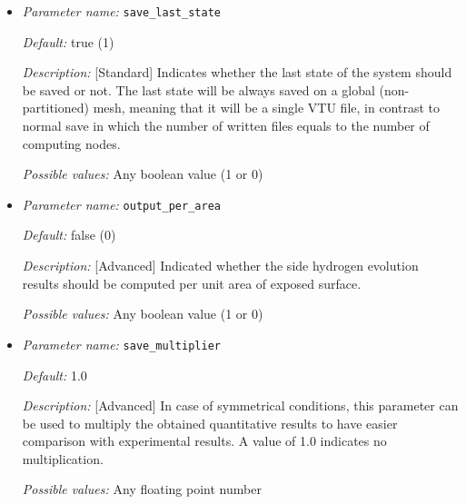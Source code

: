 \begin{itemize}

{\it Default:} 0.25

{\it Description:} [Standard] The interval of saving results, text and VTK (if selected), to disk. 

{\it Possible values:} Any floating point number


\item {\it Parameter name:} {\tt save\_last\_state}
\label{parameters:save_last_state}


{\it Default:} true (1)

{\it Description:} [Standard] Indicates whether the last state of the system should be saved or not. The last state will be always saved on a global (non-partitioned) mesh, meaning that it will be a single VTU file, in contrast to normal save in which the number of written files equals to the number of computing nodes.

{\it Possible values:} Any boolean value (1 or 0)


\item {\it Parameter name:} {\tt output\_per\_area}
\label{parameters:output_per_area}


{\it Default:} false (0)

{\it Description:} [Advanced] Indicated whether the side hydrogen evolution results should be computed per unit area of exposed surface.

{\it Possible values:} Any boolean value (1 or 0)


\item {\it Parameter name:} {\tt save\_multiplier}
\label{parameters:save_multiplier}


{\it Default:} 1.0

{\it Description:} [Advanced] In case of symmetrical conditions, this parameter can be used to multiply the obtained quantitative results to have easier comparison with experimental results. A value of 1.0 indicates no multiplication.

{\it Possible values:} Any floating point number



\end{itemize}
